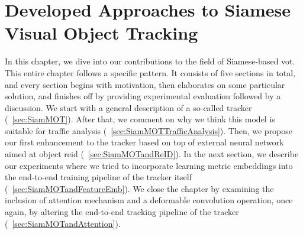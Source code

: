 \chapter{Developed Approaches to Siamese Visual Object Tracking}
\label{chap:DevelopedSiameseTrackingApproaches}

In this chapter, we dive into our contributions to the field of Siamese-based \gls{vot}. This entire chapter follows a specific pattern. It consists of five sections in total, and every section begins with motivation, then elaborates on some particular solution, and finishes off by providing experimental evaluation followed by a discussion. We start with a general description of a so-called \siammot{} tracker (\sectiontext{}~\ref{sec:SiamMOT}). After that, we comment on why we think this model is suitable for traffic analysis (\sectiontext{}~\ref{sec:SiamMOTTrafficAnalysis}). Then, we propose our first enhancement to the \siammot{} tracker based on top of external neural network aimed at object \gls{reid} (\sectiontext{}~\ref{sec:SiamMOTandReID}). In the next section, we describe our experiments where we tried to incorporate learning metric embeddings into the end-to-end training pipeline of the \siammot{} tracker itself (\sectiontext{}~\ref{sec:SiamMOTandFeatureEmb}). We close the chapter by examining the inclusion of attention mechanism and a deformable convolution operation, once again, by altering the end-to-end tracking pipeline of the \siammot{} tracker (\sectiontext{}~\ref{sec:SiamMOTandAttention}).






